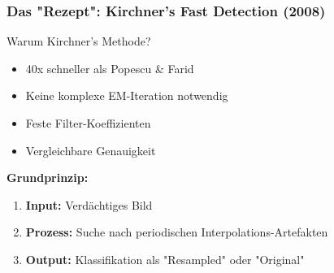 \documentclass[11pt,t,usepdftitle=false,aspectratio=169]{beamer}
\begin{document}
\begin{frame}
	\frametitle{Das "Rezept": Kirchner's Fast Detection (2008)}
	
	\begin{exampleblock}{Warum Kirchner's Methode?}
		\begin{itemize}
			\item 40x schneller als Popescu \& Farid~\cite{popescu_exposing_2005}
			\item Keine komplexe EM-Iteration notwendig
			\item Feste Filter-Koeffizienten
			\item Vergleichbare Genauigkeit
		\end{itemize}
	\end{exampleblock}
	
	\vspace{0.5em}
	
	\textbf{Grundprinzip:}
	\begin{enumerate}
		\item \textbf{Input:} Verdächtiges Bild
		\item \textbf{Prozess:} Suche nach periodischen Interpolations-Artefakten
		\item \textbf{Output:} Klassifikation als "Resampled" oder "Original"
	\end{enumerate}
\end{frame}
\end{document}
